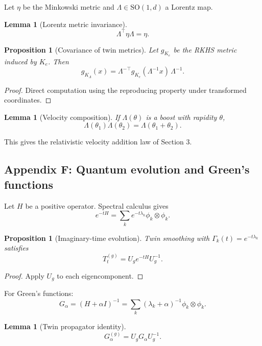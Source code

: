 \documentclass[11pt]{article}
\newtheorem{lemma}[theorem]{Lemma}
\newtheorem{proposition}[theorem]{Proposition}
\theoremstyle{definition}
\begin{document}
Let $\eta$ be the Minkowski metric and $\Lambda\in\mathrm{SO}(1,d)$ a Lorentz map.

\begin{lemma}[Lorentz metric invariance]
	\[
	\Lambda^\top \eta \Lambda = \eta.
	\]
\end{lemma}

\begin{proposition}[Covariance of twin metrics]
	Let $g_{K_e}$ be the RKHS metric induced by $K_e$.  
	Then
	\[
	g_{K_\Lambda}(x) = \Lambda^{-\top} g_{K_e}(\Lambda^{-1}x)\,\Lambda^{-1}.
	\]
\end{proposition}

\begin{proof}
	Direct computation using the reproducing property under transformed coordinates.
\end{proof}

\begin{lemma}[Velocity composition]
	If $\Lambda(\theta)$ is a boost with rapidity $\theta$,
	\[
	\Lambda(\theta_1)\Lambda(\theta_2) = \Lambda(\theta_1+\theta_2).
	\]
\end{lemma}

This gives the relativistic velocity addition law of Section 3.

\subsection{Appendix F: Quantum evolution and Green’s functions}

Let $H$ be a positive operator.  
Spectral calculus gives
\[
e^{-tH} = \sum_k e^{-t\lambda_k} \phi_k\otimes \phi_k.
\]

\begin{proposition}[Imaginary-time evolution]
	Twin smoothing with $\Gamma_k(t)=e^{-t\lambda_k}$ satisfies
	\[
	T_t^{(g)} = U_g e^{-tH} U_g^{-1}.
	\]
\end{proposition}

\begin{proof}
	Apply $U_g$ to each eigencomponent.
\end{proof}

For Green’s functions:
\[
G_\alpha = (H+\alpha I)^{-1} = \sum_k (\lambda_k+\alpha)^{-1}\phi_k\otimes\phi_k.
\]

\begin{lemma}[Twin propagator identity]
	\[
	G_\alpha^{(g)} = U_g G_\alpha U_g^{-1}.
	\]
\end{lemma}
\end{document}
